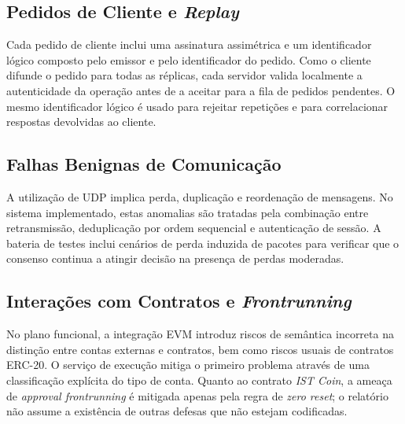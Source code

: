 \documentclass[runningheads]{llncs}
\begin{document}
\subsection{Pedidos de Cliente e \textit{Replay}}
Cada pedido de cliente inclui uma assinatura assim\'etrica e um identificador l\'ogico composto pelo emissor e pelo identificador do pedido. Como o cliente difunde o pedido para todas as r\'eplicas, cada servidor valida localmente a autenticidade da opera\c{c}\~ao antes de a aceitar para a fila de pedidos pendentes. O mesmo identificador l\'ogico \'e usado para rejeitar repeti\c{c}\~oes e para correlacionar respostas devolvidas ao cliente.

\subsection{Falhas Benignas de Comunica\c{c}\~ao}
A utiliza\c{c}\~ao de UDP implica perda, duplica\c{c}\~ao e reordena\c{c}\~ao de mensagens. No sistema implementado, estas anomalias s\~ao tratadas pela combina\c{c}\~ao entre retransmiss\~ao, deduplica\c{c}\~ao por ordem sequencial e autentica\c{c}\~ao de sess\~ao. A bateria de testes inclui cen\'arios de perda induzida de pacotes para verificar que o consenso continua a atingir decis\~ao na presen\c{c}a de perdas moderadas.

\subsection{Intera\c{c}\~oes com Contratos e \textit{Frontrunning}}
No plano funcional, a integra\c{c}\~ao EVM introduz riscos de sem\^antica incorreta na distin\c{c}\~ao entre contas externas e contratos, bem como riscos usuais de contratos ERC-20. O servi\c{c}o de execu\c{c}\~ao mitiga o primeiro problema atrav\'es de uma classifica\c{c}\~ao expl\'icita do tipo de conta. Quanto ao contrato \textit{IST Coin}, a amea\c{c}a de \textit{approval frontrunning} \'e mitigada apenas pela regra de \textit{zero reset}; o relat\'orio n\~ao assume a exist\^encia de outras defesas que n\~ao estejam codificadas.
\end{document}
